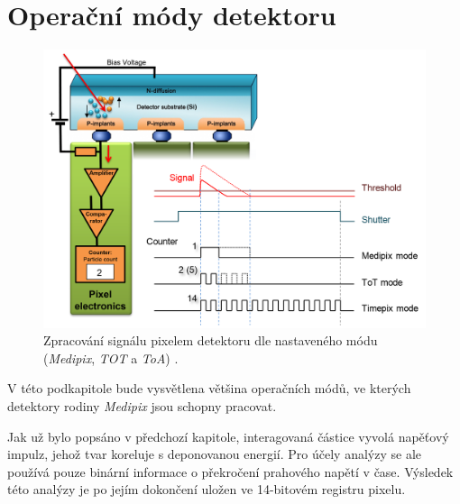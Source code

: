 \section{Operační módy detektoru}\label{chap:detectors:operation_modes}
\begin{figure}[th]
	\begin{center}
		\includegraphics[width=14cm]{figures/det_pix.png}
		\caption{Zpracování signálu pixelem detektoru dle nastaveného módu (\textit{Medipix}, \textit{TOT} a \textit{ToA}) \cite{PlatkevicDisertace}.}
		\label{fig:det:modes}
	\end{center}
\end{figure}


V této podkapitole bude vysvětlena většina operačních módů, ve kterých detektory rodiny \textit{Medipix} jsou schopny pracovat. 

Jak už bylo popsáno v předchozí kapitole, interagovaná částice vyvolá napěťový impulz, jehož tvar koreluje s deponovanou energií. Pro účely analýzy se ale používá pouze binární informace o překročení prahového napětí v čase. Výsledek této analýzy je po jejím dokončení uložen ve 14-bitovém registru pixelu.

